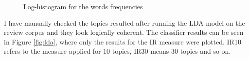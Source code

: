 \begin{figure}[ht]
\begin{center}
\qquad
\caption{Log-histogram for the words frequencies}    
\label{fig:lda-words-hist}
\end{center}
\end{figure}

I have manually checked the topics resulted after running the LDA model on the review corpus and they look logically coherent. The classifier results can be seen in Figure \ref{fig:lda}, where only the results for the IR measure were plotted. IR10 refers to the measure applied for 10 topics, IR30 means 30 topics and so on.

